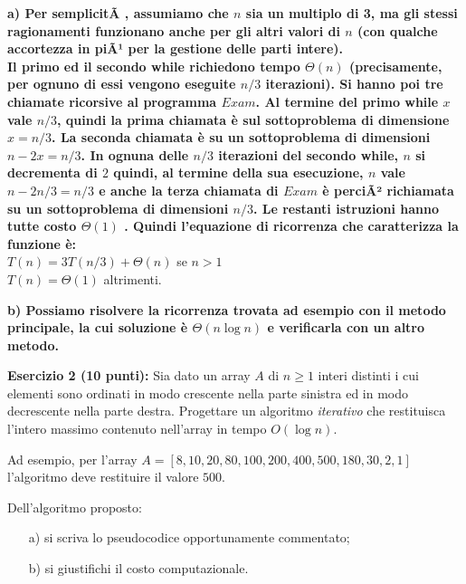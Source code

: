 \documentclass[12pt]{article}
\begin{document}
\noindent
\textbf{
a) Per semplicitÃ , assumiamo che $n$ sia un multiplo di 3, ma gli stessi ragionamenti funzionano anche per gli altri valori di $n$ (con qualche accortezza in piÃ¹ per la gestione delle parti intere).\\ 
Il primo ed il secondo while richiedono tempo $\Theta(n)$ (precisamente, per ognuno di essi vengono eseguite  $n/3$ iterazioni). Si hanno poi  tre chiamate ricorsive al programma $Exam$. 
Al termine del primo while $x$ vale $n/3$, quindi la prima chiamata \`e sul sottoproblema di dimensione $x=n/3$. 
La seconda chiamata \`e su un sottoproblema di dimensioni $n-2x=n/3$. 
In ognuna delle $n/3$ iterazioni del secondo while, $n$ si decrementa di $2$  quindi, al termine della sua esecuzione, $n$ vale $n-2n/3=n/3$ e  anche la terza chiamata di $Exam$ \`e perciÃ² richiamata su un sottoproblema di dimensioni $n/3$. 
Le restanti istruzioni hanno tutte costo $\Theta(1)$ . Quindi l'equazione di ricorrenza che caratterizza la funzione \`e:\\
}
$T(n)=3T(n/3)+\Theta(n)$ se $n > 1$ \\
$T(n)=\Theta(1)$ altrimenti.

\noindent
\textbf{
b) Possiamo risolvere la ricorrenza trovata ad esempio con il metodo principale, la cui soluzione \`e $\Theta(n \log n)$ e verificarla con un altro metodo.
}


\medskip \medskip
\noindent
\textbf{Esercizio 2 (10 punti):} 
Sia dato un array $A$ di $n\geq 1 $ interi distinti i cui elementi sono ordinati in modo crescente nella parte sinistra ed in modo decrescente nella parte destra.
Progettare un algoritmo {\em iterativo} che restituisca  l'intero massimo contenuto nell'array in tempo $O(\log n)$.

Ad esempio, per l'array $A= [8, 10, 20, 80, 100, 200, 400, 500, 180, 30, 2, 1]$ l'algoritmo deve restituire il valore $500$.

\noindent 
Dell'algoritmo proposto:
\begin{itemize}
\item[a)] si scriva lo pseudocodice opportunamente commentato;
\item[b)] si giustifichi il costo computazionale.
\end{itemize}
\end{document}
